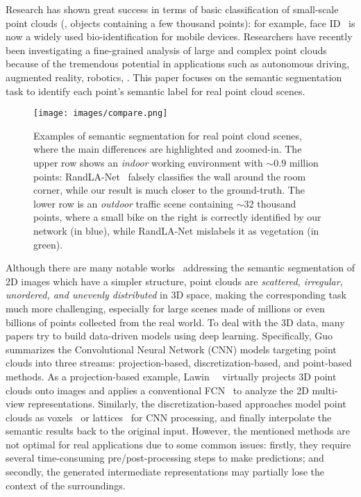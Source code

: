 \documentclass[10pt,twocolumn,letterpaper]{article}
\begin{document}
Research has shown great success in terms of basic classification of small-scale point clouds (\ie, objects containing a few thousand points): for example, face ID~\cite{hamza2008face} is now a widely used bio-identification for mobile devices. Researchers have recently been investigating a fine-grained analysis of large and complex point clouds~\cite{thomas2019kpconv, landrieu2018large, hu2020randla, xie2020pointcontrast} because of the tremendous potential in applications such as autonomous driving, augmented reality, robotics, \etc. This paper focuses on the semantic segmentation task to identify each point's semantic label for real point cloud scenes.

\begin{figure}
\begin{center}
\texttt{[image: images/compare.png]}
\end{center}
\vspace{-5mm}
\captionsetup{font=small}
\caption{Examples of semantic segmentation for real point cloud scenes, where the main differences are highlighted and zoomed-in. The upper row shows an \emph{indoor} working environment with $\sim$0.9 million points: RandLA-Net~\cite{hu2020randla} falsely classifies the wall around the room corner, while our result is much closer to the ground-truth. The lower row is an \emph{outdoor} traffic scene containing $\sim$32 thousand points, where a small bike on the right is correctly identified by our network (in blue), while RandLA-Net mislabels it as vegetation (in green).}
\label{fig:compare}
\vspace{-5mm}
\end{figure}
Although there are many notable works~\cite{ronneberger2015u, long2015fully, zhao2017pyramid} addressing the semantic segmentation of 2D images which have a simpler structure, point clouds are \emph{scattered, irregular, unordered, and unevenly distributed} in 3D space, making the corresponding task much more challenging, especially for large scenes made of millions or even billions of points collected from the real world. To deal with the 3D data, many papers try to build data-driven models using deep learning. Specifically, Guo~\etal~\cite{guo2020deep} summarizes the Convolutional Neural Network (CNN) models targeting point clouds into three streams: projection-based, discretization-based, and point-based methods. As a projection-based example, Lawin~\etal~\cite{lawin2017deep} virtually projects 3D point clouds onto images and applies a conventional FCN~\cite{long2015fully} to analyze the 2D multi-view representations. Similarly, the discretization-based approaches model point clouds as voxels~\cite{huang2016point} or lattices~\cite{su2018splatnet} for CNN processing, and finally interpolate the semantic results back to the original input. However, the mentioned methods are not optimal for real applications due to some common issues: firstly, they require several time-consuming pre/post-processing steps to make predictions; and secondly, the generated intermediate representations may partially lose the context of the surroundings. 
\end{document}
